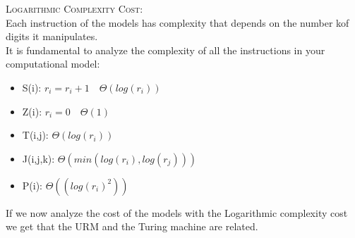 \textsc{Logarithmic Complexity Cost}:\\
Each instruction of the models has complexity that depends on the number kof digits it manipulates.\\
It is fundamental to analyze the complexity of all the instructions in your computational model:
\begin{itemize}
    \item S(i): $r_i = r_i+1 \quad \Theta(log(r_i))$
    \item Z(i): $r_i = 0 \quad \Theta(1)$
    \item T(i,j): $\Theta(log(r_i))$
    \item J(i,j,k): $\Theta(min(log(r_i), log(r_j)))$
    \item P(i): $\Theta((log(r_i)^2))$
\end{itemize}
If we now analyze the cost of the models with the Logarithmic complexity cost we get that the URM and the Turing machine are related. 
